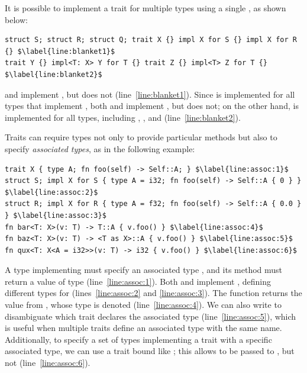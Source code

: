 It is possible to implement a trait for multiple types using a single ,
as shown below:

\vspace{-0.5em}
\begin{lstlisting}
struct S; struct R; struct Q; trait X {} impl X for S {} impl X for R {} $\label{line:blanket1}$
trait Y {} impl<T: X> Y for T {} trait Z {} impl<T> Z for T {} $\label{line:blanket2}$
\end{lstlisting}
\vspace{-0.5em}

\noindent
%
 and  implement , but  does not (line~\ref{line:blanket1}).
%
Since  is implemented for all types that implement , both  and
 implement , but  does not;
%
on the other hand,  is implemented for all types, including , ,
and  (line~\ref{line:blanket2}).

Traits can require types not only to provide particular methods but also to
specify \emph{associated types}, as in the following example:

\vspace{-0.5em}
\begin{lstlisting}
trait X { type A; fn foo(self) -> Self::A; } $\label{line:assoc:1}$
struct S; impl X for S { type A = i32; fn foo(self) -> Self::A { 0 } } $\label{line:assoc:2}$
struct R; impl X for R { type A = f32; fn foo(self) -> Self::A { 0.0 } } $\label{line:assoc:3}$
fn bar<T: X>(v: T) -> T::A { v.foo() } $\label{line:assoc:4}$
fn baz<T: X>(v: T) -> <T as X>::A { v.foo() } $\label{line:assoc:5}$
fn qux<T: X<A = i32>>(v: T) -> i32 { v.foo() } $\label{line:assoc:6}$
\end{lstlisting}
\vspace{-0.5em}

\noindent
%
A type implementing  must specify an associated type , and its method
 must return a value of type  (line~\ref{line:assoc:1}).
%
Both  and  implement , defining different types for 
(lines~\ref{line:assoc:2} and \ref{line:assoc:3}).
%
The function  returns the value from , whose type is denoted
 (line~\ref{line:assoc:4}).
%
We can also write  to disambiguate which trait declares the
associated type (line~\ref{line:assoc:5}), which is useful when multiple traits
define an associated type with the same name.
%
Additionally, to specify a set of types implementing a trait with a specific
associated type, we can use a trait bound like ;
%
this allows  to be passed to , but not 
(line~\ref{line:assoc:6}).

